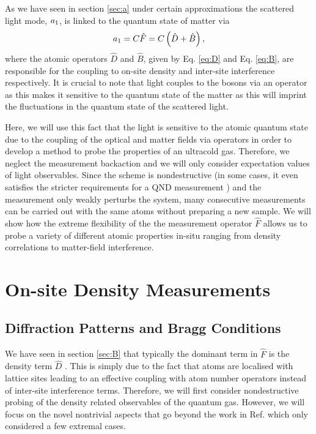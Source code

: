 As we have seen in section \ref{sec:a} under certain approximations
the scattered light mode, $a_1$, is linked to the quantum state of
matter via 
\begin{equation}
  \label{eq:a-3}
  a_1 = C \hat{F} = C \left(\hat{D} + \hat{B} \right),
\end{equation}
where the atomic operators $\hat{D}$ and $\hat{B}$, given by
Eq. \eqref{eq:D} and Eq. \eqref{eq:B}, are responsible for the
coupling to on-site density and inter-site interference
respectively. It is crucial to note that light couples to the bosons
via an operator as this makes it sensitive to the quantum state of the
matter as this will imprint the fluctuations in the quantum state of
the scattered light.

Here, we will use this fact that the light is sensitive to the atomic
quantum state due to the coupling of the optical and matter fields via
operators in order to develop a method to probe the properties of an
ultracold gas. Therefore, we neglect the measurement backaction and
we will only consider expectation values of light observables. Since
the scheme is nondestructive (in some cases, it even satisfies the
stricter requirements for a QND measurement \cite{mekhov2012,
  mekhov2007pra}) and the measurement only weakly perturbs the system,
many consecutive measurements can be carried out with the same atoms
without preparing a new sample. We will show how the extreme
flexibility of the the measurement operator $\hat{F}$ allows us to
probe a variety of different atomic properties in-situ ranging from
density correlations to matter-field interference.

\section{On-site Density Measurements}

\subsection{Diffraction Patterns and Bragg Conditions}

We have seen in section \ref{sec:B} that typically the dominant term
in $\hat{F}$ is the density term $\hat{D}$ \cite{LP2009,
  mekhov2007pra, rist2010, lakomy2009, ruostekoski2009}. This is
simply due to the fact that atoms are localised with lattice sites
leading to an effective coupling with atom number operators instead of
inter-site interference terms. Therefore, we will first consider
nondestructive probing of the density related observables of the
quantum gas. However, we will focus on the novel nontrivial aspects
that go beyond the work in Ref. \cite{mekhov2012, mekhov2007prl,
  mekhov2007pra} which only considered a few extremal cases.

